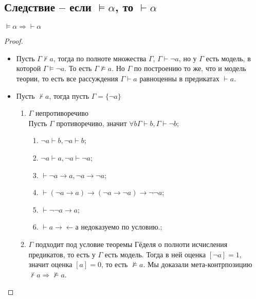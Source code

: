 \subsection{Следствие -- если \texorpdfstring{$\models \alpha$}{⊨ a}, то \texorpdfstring{$\vdash \alpha$}{⊢ a}}
\label{sec-8-7}
\begin{theorem}
$\models \alpha \Rightarrow \vdash \alpha$
\end{theorem}
\begin{proof}
\begin{itemize}
\item Пусть $\Gamma \not \vdash a$, тогда по полноте множества $\Gamma$, $\Gamma \vdash \neg a$, но у $\Gamma$ есть модель, в которой $\Gamma \models \neg a$. То есть $\Gamma \not \models a$. Но $\Gamma$ по построению то же, что и модель теории, то есть все рассуждения $\Gamma \vdash a$ равноценны в предикатах $\vdash a$.
\item Пусть $\not \vdash a$, тогда пусть $\Gamma=\lbrace \neg a \rbrace$
\begin{enumerate}
\item $\Gamma$ непротиворечиво\\
Пусть $\Gamma$ противоречиво, значит $\forall b \Gamma \vdash b, \Gamma \vdash \neg b$;
\begin{enumerate}[label=(\alph*)]
\item $\neg a \vdash b, \neg a \vdash b$;
\item $\neg a \vdash a, \neg a \vdash \neg a$;
\item $\vdash \neg a \to a, \neg a \to \neg a$;
\item $\vdash (\neg a \to a) \to (\neg a \to \neg a) \to \neg \neg a$;
\item $\vdash \neg \neg a \to a$;
\item $\vdash a \to\leftarrow а$ недоказуемо по условию.;
\end{enumerate}
\item $\Gamma$ подходит под условие теоремы Гёделя о полноти исчисления предикатов, то есть у $\Gamma$ есть модель. Тогда в ней оценка $[\neg a] = 1$, значит оценка $[a] = 0$, то есть $\not \models a$. Мы доказали мета-контрпозицию $\not \vdash a \Rightarrow \not \models a$.
\end{enumerate}
\end{itemize}
\end{proof}
